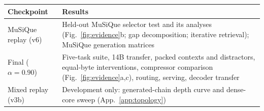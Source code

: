 \begin{tabular}{@{}p{}p{}@{}}
\toprule
Checkpoint & Results \\
\midrule
MuSiQue replay (v6) & Held-out MuSiQue selector test and its analyses (Fig.~\ref{fig:evidence}b; gap decomposition; iterative retrieval); MuSiQue generation matrices \\
\addlinespace[2pt]
Final ($\alpha{=}0.90$) & Five-task suite, 14B transfer, packed contexts and distractors, equal-byte interventions, compressor comparison (Fig.~\ref{fig:evidence}a,c), routing, serving, decoder transfer \\
\addlinespace[2pt]
Mixed replay (v3b) & Development only: generated-chain depth curve and dense-core sweep (App.~\ref{app:topology}) \\
\bottomrule
\end{tabular}
